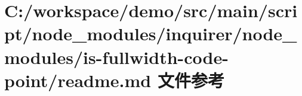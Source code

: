 \hypertarget{node__modules_2inquirer_2node__modules_2is-fullwidth-code-point_2_r_e_a_d_m_e_8md}{}\section{C\+:/workspace/demo/src/main/script/node\+\_\+modules/inquirer/node\+\_\+modules/is-\/fullwidth-\/code-\/point/readme.md 文件参考}
\label{node__modules_2inquirer_2node__modules_2is-fullwidth-code-point_2_r_e_a_d_m_e_8md}
